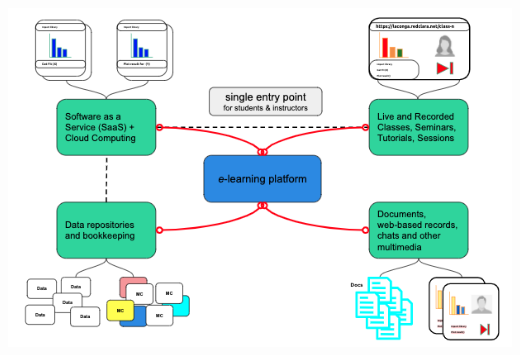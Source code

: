\begin{frame}[fragile]
\begin{columns}[c]
\begin{center}
\includegraphics[scale=0.23]{imagenes/Elearning.png}
\end{center}

\end{columns}

\end{frame}

